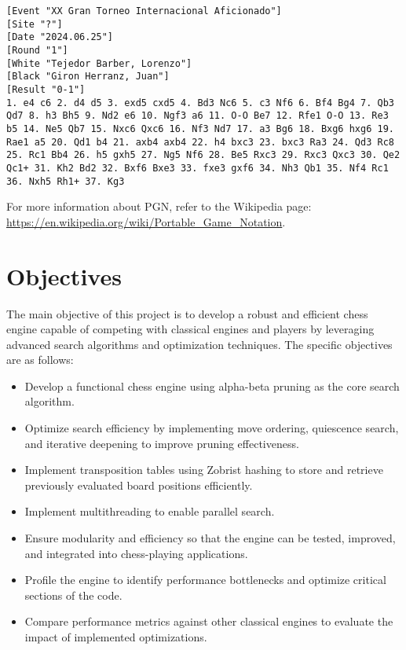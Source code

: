 \begin{lstlisting}[basicstyle=\ttfamily\small, breaklines=true, frame=single, caption={Example of a PGN file}, label={lst:pgn-example}]
[Event "XX Gran Torneo Internacional Aficionado"]
[Site "?"]
[Date "2024.06.25"]
[Round "1"]
[White "Tejedor Barber, Lorenzo"]
[Black "Giron Herranz, Juan"]
[Result "0-1"]
1. e4 c6 2. d4 d5 3. exd5 cxd5 4. Bd3 Nc6 5. c3 Nf6 6. Bf4 Bg4 7. Qb3 Qd7 8. h3 Bh5 9. Nd2 e6 10. Ngf3 a6 11. O-O Be7 12. Rfe1 O-O 13. Re3 b5 14. Ne5 Qb7 15. Nxc6 Qxc6 16. Nf3 Nd7 17. a3 Bg6 18. Bxg6 hxg6 19. Rae1 a5 20. Qd1 b4 21. axb4 axb4 22. h4 bxc3 23. bxc3 Ra3 24. Qd3 Rc8 25. Rc1 Bb4 26. h5 gxh5 27. Ng5 Nf6 28. Be5 Rxc3 29. Rxc3 Qxc3 30. Qe2 Qc1+ 31. Kh2 Bd2 32. Bxf6 Bxe3 33. fxe3 gxf6 34. Nh3 Qb1 35. Nf4 Rc1 36. Nxh5 Rh1+ 37. Kg3
\end{lstlisting}

\noindent For more information about PGN, refer to the Wikipedia page: \url{https://en.wikipedia.org/wiki/Portable_Game_Notation}.

\section{Objectives}
\label{sec:objectives}

The main objective of this project is to develop a robust and efficient chess engine capable of competing with classical engines and players by leveraging advanced search algorithms and optimization techniques. The specific objectives are as follows:

\begin{itemize}
    \item Develop a functional chess engine using alpha-beta pruning as the core search algorithm.
    \item Optimize search efficiency by implementing move ordering, quiescence search, and iterative deepening to improve pruning effectiveness.
    \item Implement transposition tables using Zobrist hashing to store and retrieve previously evaluated board positions efficiently.
    \item Implement multithreading to enable parallel search.
    \item Ensure modularity and efficiency so that the engine can be tested, improved, and integrated into chess-playing applications.
    \item Profile the engine to identify performance bottlenecks and optimize critical sections of the code.
    \item Compare performance metrics against other classical engines to evaluate the impact of implemented optimizations.
\end{itemize}

